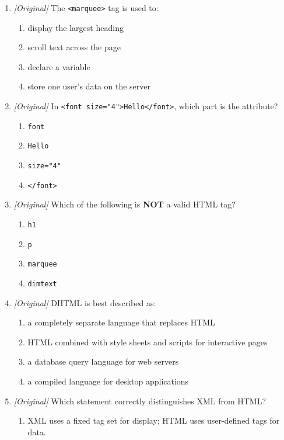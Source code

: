 \begin{enumerate}[label=\textbf{Q\arabic*.}, leftmargin=*]
\begin{enumerate}[label=\Alph*.]
    \item \texttt{<head>}
  \end{enumerate}
\item \textit{[Original]} The \texttt{<marquee>} tag is used to:
  \begin{enumerate}[label=\Alph*.]
    \item display the largest heading
    \item scroll text across the page
    \item declare a variable
    \item store one user's data on the server
  \end{enumerate}
\item \textit{[Original]} In \texttt{<font size="4">Hello</font>}, which part
  is the attribute?
  \begin{enumerate}[label=\Alph*.]
    \item \texttt{font}
    \item \texttt{Hello}
    \item \texttt{size="4"}
    \item \texttt{</font>}
  \end{enumerate}
\item \textit{[Original]} Which of the following is \textbf{NOT} a valid HTML
  tag?
  \begin{enumerate}[label=\Alph*.]
    \item \texttt{h1}
    \item \texttt{p}
    \item \texttt{marquee}
    \item \texttt{dimtext}
  \end{enumerate}
\item \textit{[Original]} DHTML is best described as:
  \begin{enumerate}[label=\Alph*.]
    \item a completely separate language that replaces HTML
    \item HTML combined with style sheets and scripts for interactive pages
    \item a database query language for web servers
    \item a compiled language for desktop applications
  \end{enumerate}
\item \textit{[Original]} Which statement correctly distinguishes XML from HTML?
  \begin{enumerate}[label=\Alph*.]
    \item XML uses a fixed tag set for display; HTML uses user-defined tags for data.

\end{enumerate}
\end{enumerate}
